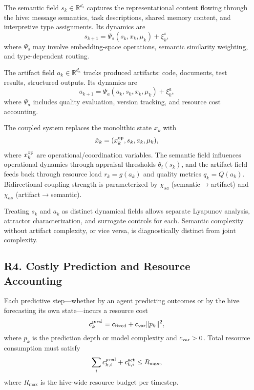 \begin{definition}
The semantic field $s_k\in\mathbb R^{d_s}$ captures the representational content
flowing through the hive: message semantics, task descriptions, shared memory
content, and interpretive type assignments.  Its dynamics are
\[
  s_{k+1}=\Psi_s(s_k,x_k,\mu_k)+\xi^s_k,
\]
where $\Psi_s$ may involve embedding-space operations, semantic similarity
weighting, and type-dependent routing.
\end{definition}

\begin{definition}
The artifact field $a_k\in\mathbb R^{d_a}$ tracks produced artifacts: code,
documents, test results, structured outputs.  Its dynamics are
\[
  a_{k+1}=\Psi_a(a_k,s_k,x_k,\mu_k)+\xi^a_k,
\]
where $\Psi_a$ includes quality evaluation, version tracking, and resource cost
accounting.
\end{definition}

\begin{definition}
The coupled system replaces the monolithic state $x_k$ with
\[
  \tilde x_k=(x_k^{\rm op},s_k,a_k,\mu_k),
\]
where $x_k^{\rm op}$ are operational/coordination variables.  The semantic field
influences operational dynamics through appraisal thresholds $\theta_i(s_k)$,
and the artifact field feeds back through resource load $r_k=g(a_k)$ and
quality metrics $q_k=Q(a_k)$.  Bidirectional coupling strength is parameterized
by $\chi_{sa}$ (semantic$\to$artifact) and $\chi_{as}$ (artifact$\to$semantic).
\end{definition}

\begin{designprinciple}
Treating $s_k$ and $a_k$ as distinct dynamical fields allows separate Lyapunov
analysis, attractor characterization, and surrogate controls for each.  Semantic
complexity without artifact complexity, or vice versa, is diagnostically distinct
from joint complexity.
\end{designprinciple}

\subsection*{R4. Costly Prediction and Resource Accounting}

\begin{definition}
Each predictive step---whether by an agent predicting outcomes or by the hive
forecasting its own state---incurs a resource cost
\[
  c_k^{\rm pred}=c_{\rm fixed}+c_{\rm var}\|p_k\|^2,
\]
where $p_k$ is the prediction depth or model complexity and $c_{\rm var}>0$.
Total resource consumption must satisfy
\[
  \sum_{i} c_{k,i}^{\rm pred}+c_{k,i}^{\rm act}\le R_{\max},
\]
where $R_{\max}$ is the hive-wide resource budget per timestep.
\end{definition}

